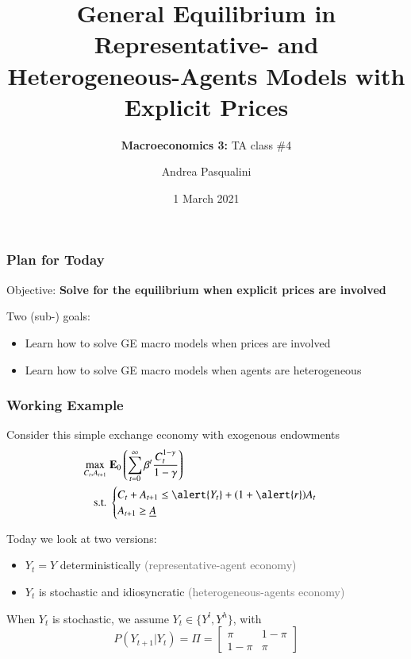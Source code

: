\documentclass[10pt, aspectratio=1610, natbib, handout]{beamer}
\title[GE with Prices]{
  \textbf{General Equilibrium in Representative- and Heterogeneous-Agents Models with Explicit Prices}
}
\subtitle[Macro 3: TA\#4]{
  \textbf{Macroeconomics 3:} TA class \#4
}
\author[A.~Pasqualini]{
  Andrea Pasqualini
}
\institute[Bocconi]{Bocconi University}
\date{
  1 March 2021
}
\newcommand{\dimmer}[1]{\textcolor{dimgray}{#1}}
\newcommand{\E}{\mathbf{E}}
\begin{document}
  \begin{frame}
    \maketitle
  \end{frame}

  \begin{frame}
    \frametitle{Plan for Today}

    Objective: \textbf{Solve for the equilibrium when explicit prices are involved}

    \vfill\pause

    Two (sub-) goals:
    \begin{itemize}
      \item Learn how to solve GE macro models when prices are involved
      \item Learn how to solve GE macro models when agents are heterogeneous
    \end{itemize}

  \end{frame}

  \begin{frame}
    \frametitle{Working Example}

    Consider this simple exchange economy with exogenous endowments
    \begin{align*}
      \max_{C_t, A_{t+1}} &\; \E_0 \left( \sum_{t=0}^{\infty} \beta^t \frac{C_t^{1-\gamma}}{1-\gamma} \right) \\
      \text{s.t.} &\;
      \begin{cases}
        C_t + A_{t+1} \leq \alert{Y_t} + (1 + \alert{r}) A_t \\
        A_{t+1} \geq \underline{A}
      \end{cases}
    \end{align*}

    \vfill\pause

    Today we look at two versions:
    \begin{itemize}
      \item $Y_t = Y$ deterministically \hfill\dimmer{(representative-agent economy)}
      \item $Y_t$ is stochastic and idiosyncratic \hfill\dimmer{(heterogeneous-agents economy)}
    \end{itemize}

    \vfill\pause

    When $Y_t$ is stochastic, we assume $Y_t \in \{ Y^l, Y^h \}$, with
    \begin{equation*}
      P(Y_{t+1} | Y_t) = \Pi =
      \begin{bmatrix}
        \pi & 1 - \pi \\
        1 - \pi & \pi
      \end{bmatrix}
    \end{equation*}

  \end{frame}
\end{document}
